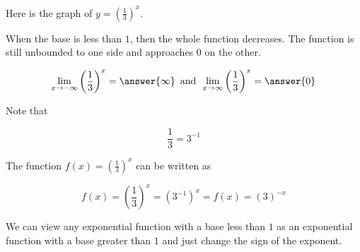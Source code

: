 \documentclass{ximera}
\begin{document}
\begin{example}



Here is the graph of $y = \left(\frac{1}{3}\right)^x$.

\begin{image}
\end{image}


When the base is less than $1$, then the whole function decreases.  The function is still unbounded to one side and approaches $0$ on the other.

\[  \lim_{x \to -\infty} \left(\frac{1}{3}\right)^x = \answer{\infty}     \, \text{ and } \,  \lim_{x \to \infty} \left(\frac{1}{3}\right)^x = \answer{0}   \]

\end{example}




Note that

\[
\frac{1}{3} = 3^{-1}
\]




The function  $f(x) = \left(\frac{1}{3}\right)^x$ can be written as 

\[
f(x) = \left(\frac{1}{3}\right)^x = \left( 3^{-1} \right)^x = f(x) = \left( 3 \right)^{-x}
\]




We can view any exponential function with a base less than $1$ as an exponential function with a base greater than $1$ and just change the sign of the exponent. \\
\end{document}
